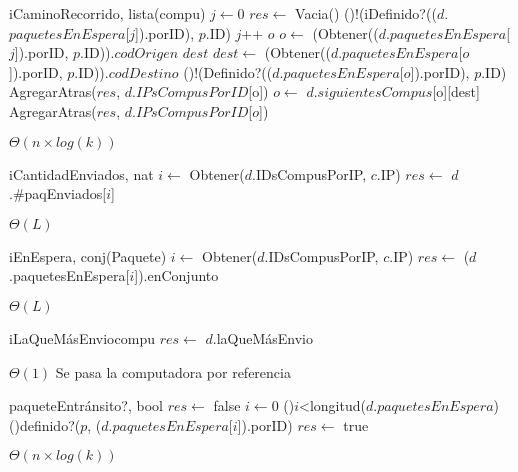 \begin{Algoritmos}
  \begin{algoritmo}{iCaminoRecorrido}{, }{lista(compu)}
     $j \gets 0$
    $res \gets$ Vacia()
    \While(){!(iDefinido?(($d$.$paquetesEnEspera$[$j$]).porID), $p$.ID)}{
      $j$++
    }
     $o$
    $o \gets$ (Obtener(($d$.$paquetesEnEspera$[$j$]).porID, $p$.ID)).$codOrigen$
     $dest$
    $dest \gets$ (Obtener(($d$.$paquetesEnEspera$[$o$]).porID, $p$.ID)).$codDestino$
    \While(){!(Definido?(($d$.$paquetesEnEspera$[$o$]).porID), $p$.ID)}{
      AgregarAtras($res$, $d$.$IPsCompusPorID$[o])
      $o \gets$ $d$.$siguientesCompus$[o][dest]
    }
    AgregarAtras($res$, $d$.$IPsCompusPorID$[$o$])
  \end{algoritmo} 
  \datosAlgoritmo{} %
  {} %
  {} %
  {$\Theta(n \times log(k))$} %
  {} %

  \begin{algoritmo}{iCantidadEnviados}{, }{nat}
     $i \gets$ Obtener($d$.IDsCompusPorIP, $c$.IP)
    $res \gets$ $d$.\#paqEnviados[$i$]
  \end{algoritmo}
 \datosAlgoritmo{} %
  {} %
  {} %
  {$\Theta(L)$} %
  {} %

  \begin{algoritmo}{iEnEspera}{, }{conj(Paquete)}
     $i \gets$ Obtener($d$.IDsCompusPorIP, $c$.IP)
    $res \gets$ ($d$.paquetesEnEspera[$i$]).enConjunto
  \end{algoritmo}
 \datosAlgoritmo{} %
  {} %
  {} %
  {$\Theta(L)$} %
  {} %

  \begin{algoritmo}{iLaQueM\'{a}sEnvio}{}{compu}
    $res \gets$ $d$.laQueM\'{a}sEnvio 
  \end{algoritmo}
  \datosAlgoritmo{} %
  {} %
  {} %
  {$\Theta(1)$} %
  {Se pasa la computadora por referencia} %

  \begin{algoritmo}{paqueteEntr\'{a}nsito?}{, }{bool}
    $res \gets$ false 
     $i \gets 0$
    \While(){$i$<longitud($d$.$paquetesEnEspera$)}{
      \If(){definido?($p$, ($d$.$paquetesEnEspera$[$i$]).porID)}{
          $res \gets$ true
      }
    }
  \end{algoritmo}
  \datosAlgoritmo{} %
  {} %
  {} %
  {$\Theta(n \times log(k))$} %
  {} %

\end{Algoritmos}

